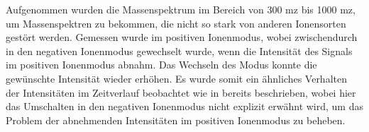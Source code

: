 Aufgenommen wurden die Massenspektrum im Bereich von 300 \gls{mz} bis 1000 \gls{mz}, um  Massenspektren zu bekommen, die nicht so stark von anderen Ionensorten gestört werden. Gemessen wurde im positiven Ionenmodus, wobei zwischendurch in den negativen Ionenmodus gewechselt wurde, wenn die Intensität des Signals im positiven Ionenmodus abnahm. Das Wechseln des Modus konnte die gewünschte Intensität wieder erhöhen. Es wurde somit ein ähnliches Verhalten der Intensitäten im Zeitverlauf beobachtet wie in \cite{RapidScreeningLeafSpray} bereits beschrieben, wobei hier das Umschalten in den negativen Ionenmodus nicht explizit erwähnt wird, um das Problem der abnehmenden Intensitäten im positiven Ionenmodus zu beheben.


